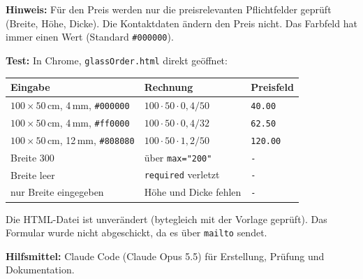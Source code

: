\documentclass[11pt,a4paper]{article}
\begin{document}
\textbf{Hinweis:} Für den Preis werden nur die preisrelevanten
Pflichtfelder geprüft (Breite, Höhe, Dicke). Die Kontaktdaten ändern den
Preis nicht. Das Farbfeld hat immer einen Wert (Standard \texttt{\#000000}).

\medskip
\textbf{Test:} In Chrome, \texttt{glassOrder.html} direkt geöffnet:
\begin{center}
\begin{tabular}{|>{\raggedright\arraybackslash}p{6.3cm}|>{\raggedright\arraybackslash}p{5.2cm}|>{\raggedright\arraybackslash}p{2.2cm}|}
\hline
\textbf{Eingabe} & \textbf{Rechnung} & \textbf{Preisfeld} \\ \hline
$100 \times 50$\,cm, 4\,mm, \texttt{\#000000} & $100 \cdot 50 \cdot 0{,}4 / 50$ & \texttt{40.00} \\ \hline
$100 \times 50$\,cm, 4\,mm, \texttt{\#ff0000} & $100 \cdot 50 \cdot 0{,}4 / 32$ & \texttt{62.50} \\ \hline
$100 \times 50$\,cm, 12\,mm, \texttt{\#808080} & $100 \cdot 50 \cdot 1{,}2 / 50$ & \texttt{120.00} \\ \hline
Breite 300 & über \texttt{max="200"} & \texttt{-} \\ \hline
Breite leer & \texttt{required} verletzt & \texttt{-} \\ \hline
nur Breite eingegeben & Höhe und Dicke fehlen & \texttt{-} \\ \hline
\end{tabular}
\end{center}
Die HTML-Datei ist unverändert (bytegleich mit der Vorlage geprüft).
Das Formular wurde nicht abgeschickt, da es über \texttt{mailto} sendet.

\medskip
{\small \textbf{Hilfsmittel:} Claude Code (Claude Opus 5.5) für Erstellung, Prüfung und Dokumentation.}
\end{document}
